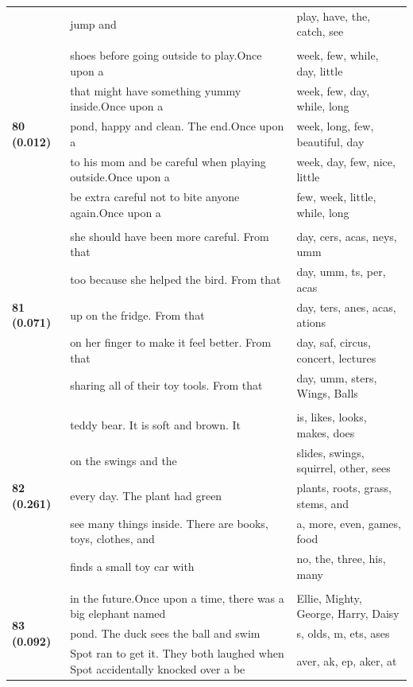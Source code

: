 \documentclass{article}
\theoremstyle{plain}
\theoremstyle{definition}
\theoremstyle{remark}
\begin{document}
\begin{longtable}{|p{}|p{}|p{}|}
& jump and & play,  have,  the,  catch,  see \\
& & \\
\multirow{5}{*}{\textbf{80 (0.012)}} & shoes before going outside to play.Once upon a & week,  few,  while,  day,  little \\
& that might have something yummy inside.Once upon a & week,  few,  day,  while,  long \\
& pond, happy and clean. The end.Once upon a & week,  long,  few,  beautiful,  day \\
& to his mom and be careful when playing outside.Once upon a & week,  day,  few,  nice,  little \\
& be extra careful not to bite anyone again.Once upon a & few,  week,  little,  while,  long \\
& & \\
\multirow{5}{*}{\textbf{81 (0.071)}} & she should have been more careful. From that & day, cers, acas, neys, umm \\
& too because she helped the bird. From that & day, umm, ts, per, acas \\
& up on the fridge. From that & day, ters, anes, acas, ations \\
& on her finger to make it feel better. From that & day,  saf,  circus,  concert,  lectures \\
& sharing all of their toy tools. From that & day, umm, sters,  Wings,  Balls \\
& & \\
\multirow{5}{*}{\textbf{82 (0.261)}} & teddy bear. It is soft and brown. It & is,  likes,  looks,  makes,  does \\
& on the swings and the & slides,  swings,  squirrel,  other,  sees \\
& every day. The plant had green & plants,  roots,  grass,  stems,  and \\
& see many things inside. There are books, toys, clothes, and & a,  more,  even,  games,  food \\
& finds a small toy car with & no,  the,  three,  his,  many \\
& & \\
\multirow{5}{*}{\textbf{83 (0.092)}} & in the future.Once upon a time, there was a big elephant named & Ellie,  Mighty,  George,  Harry,  Daisy \\
& pond. The duck sees the ball and swim & s, olds, m, ets, ases \\
& Spot ran to get it. They both laughed when Spot accidentally knocked over a be & aver, ak, ep, aker, at \\

\end{longtable}
\end{document}
